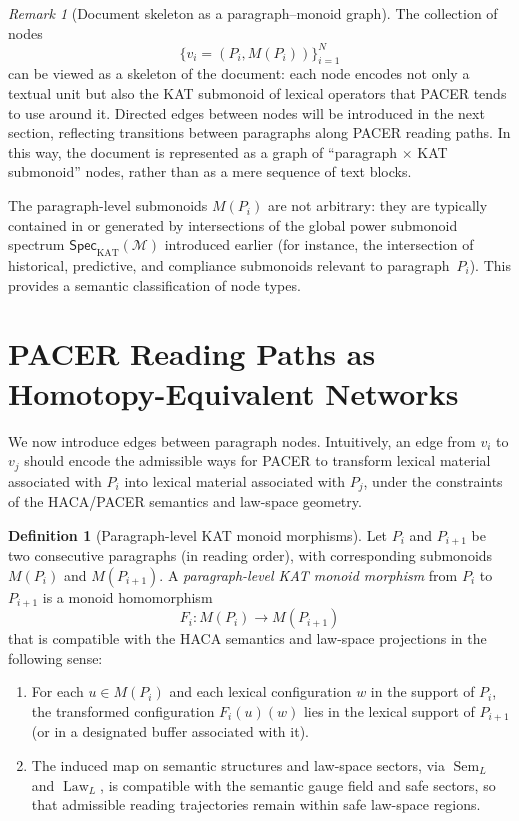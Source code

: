 \documentclass[11pt]{book}
\theoremstyle{plain}
\theoremstyle{definition}
\newtheorem{definition}[theorem]{Definition}
\theoremstyle{remark}
\newtheorem{remark}[theorem]{Remark}
\begin{document}
\begin{remark}[Document skeleton as a paragraph–monoid graph]
\label{rem:paragraph-monoid-graph}
The collection of nodes
\[
  \{v_i=(P_i,M(P_i))\}_{i=1}^N
\]
can be viewed as a skeleton of the document: each node encodes not
only a textual unit but also the KAT submonoid of lexical operators
that PACER tends to use around it. Directed edges between nodes will
be introduced in the next section, reflecting transitions between
paragraphs along PACER reading paths. In this way, the document is
represented as a graph of ``paragraph $\times$ KAT submonoid'' nodes,
rather than as a mere sequence of text blocks.
\end{remark}

The paragraph-level submonoids $M(P_i)$ are not arbitrary: they are
typically contained in or generated by intersections of the global
power submonoid spectrum
$\mathsf{Spec}_{\mathrm{KAT}}(\mathcal{M})$ introduced earlier (for
instance, the intersection of historical, predictive, and compliance
submonoids relevant to paragraph~$P_i$). This provides a semantic
classification of node types.

\section{PACER Reading Paths as Homotopy-Equivalent Networks}


We now introduce edges between paragraph nodes. Intuitively, an edge
from $v_i$ to $v_j$ should encode the admissible ways for PACER to
transform lexical material associated with $P_i$ into lexical material
associated with $P_j$, under the constraints of the HACA/PACER
semantics and law-space geometry.

\begin{definition}[Paragraph-level KAT monoid morphisms]
\label{def:paragraph-monoid-morphism}
Let $P_i$ and $P_{i+1}$ be two consecutive paragraphs (in reading
order), with corresponding submonoids $M(P_i)$ and $M(P_{i+1})$. A
\emph{paragraph-level KAT monoid morphism} from $P_i$ to $P_{i+1}$ is
a monoid homomorphism
\[
  F_i : M(P_i)\longrightarrow M(P_{i+1})
\]
that is compatible with the HACA semantics and law-space projections
in the following sense:
\begin{enumerate}
  \item For each $u\in M(P_i)$ and each lexical configuration $w$ in
        the support of $P_i$, the transformed configuration
        $F_i(u)(w)$ lies in the lexical support of $P_{i+1}$ (or in a
        designated buffer associated with it).
  \item The induced map on semantic structures and law-space sectors,
        via $\operatorname{Sem}_L$ and $\operatorname{Law}_L$, is
        compatible with the semantic gauge field and safe sectors, so
        that admissible reading trajectories remain within safe
        law-space regions.
\end{enumerate}
\end{definition}
\end{document}
